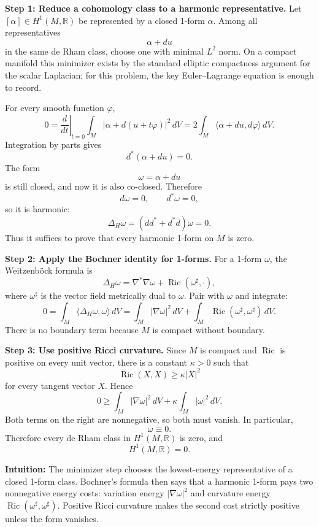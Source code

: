 \begin{solution}
\textbf{Step 1: Reduce a cohomology class to a harmonic representative.}
Let $[\alpha]\in H^1(M,\mathbb{R})$ be represented by a closed 1-form $\alpha$. Among all representatives
\[
\alpha+du
\]
in the same de Rham class, choose one with minimal $L^2$ norm. On a compact manifold this minimizer exists by the standard elliptic compactness argument for the scalar Laplacian; for this problem, the key Euler--Lagrange equation is enough to record.

For every smooth function $\varphi$,
\[
0
=
\left.\frac{d}{dt}\right|_{t=0}
\int_M |\alpha+d(u+t\varphi)|^2\,dV
=
2\int_M \langle \alpha+du,d\varphi\rangle\,dV.
\]
Integration by parts gives
\[
d^*(\alpha+du)=0.
\]
The form
\[
\omega=\alpha+du
\]
is still closed, and now it is also co-closed. Therefore
\[
d\omega=0,\qquad d^*\omega=0,
\]
so it is harmonic:
\[
\Delta_H\omega=(dd^*+d^*d)\omega=0.
\]
Thus it suffices to prove that every harmonic 1-form on $M$ is zero.

\textbf{Step 2: Apply the Bochner identity for 1-forms.}
For a 1-form $\omega$, the Weitzenböck formula is
\[
\Delta_H\omega=\nabla^*\nabla\omega+\operatorname{Ric}(\omega^\sharp,\cdot),
\]
where $\omega^\sharp$ is the vector field metrically dual to $\omega$. Pair with $\omega$ and integrate:
\[
0
=
\int_M \langle \Delta_H\omega,\omega\rangle\,dV
=
\int_M |\nabla\omega|^2\,dV
+
\int_M \operatorname{Ric}(\omega^\sharp,\omega^\sharp)\,dV.
\]
There is no boundary term because $M$ is compact without boundary.

\textbf{Step 3: Use positive Ricci curvature.}
Since $M$ is compact and $\operatorname{Ric}$ is positive on every unit vector, there is a constant $\kappa>0$ such that
\[
\operatorname{Ric}(X,X)\geq \kappa |X|^2
\]
for every tangent vector $X$. Hence
\[
0
\geq
\int_M |\nabla\omega|^2\,dV
+
\kappa\int_M |\omega|^2\,dV.
\]
Both terms on the right are nonnegative, so both must vanish. In particular,
\[
\omega\equiv0.
\]
Therefore every de Rham class in $H^1(M,\mathbb{R})$ is zero, and
\[
H^1(M,\mathbb{R})=0.
\]

\textbf{Intuition:}
The minimizer step chooses the lowest-energy representative of a closed 1-form class. Bochner's formula then says that a harmonic 1-form pays two nonnegative energy costs: variation energy $|\nabla\omega|^2$ and curvature energy $\operatorname{Ric}(\omega^\sharp,\omega^\sharp)$. Positive Ricci curvature makes the second cost strictly positive unless the form vanishes.
\end{solution}

